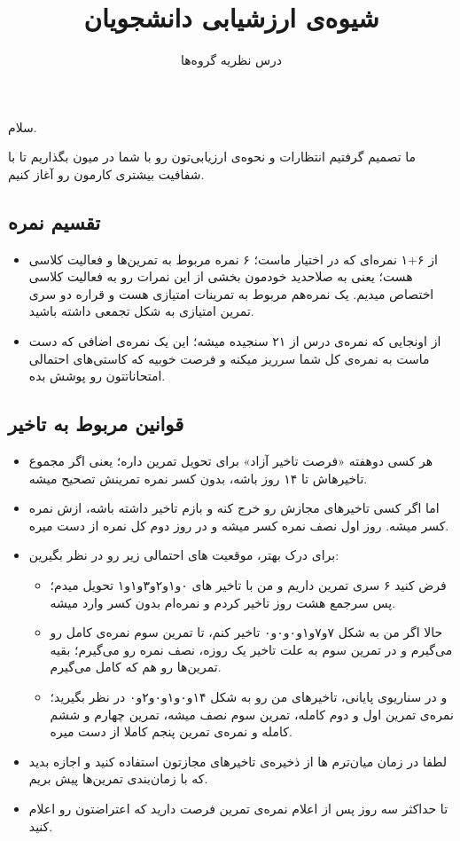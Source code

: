 \documentclass[a4paper, 12pt]{article}
\title{\textbf{
 شیوه‌ی ارزشیابی دانشجویان
}}
\author{درس نظریه گروه‌ها}
\date{}
\begin{document}
\maketitle
سلام.

\noindent

ما تصمیم گرفتیم انتظارات و نحوه‌ی ارزیابی‌تون رو با شما در میون بگذاریم تا با شفافیت بیشتری کارمون رو آغاز کنیم.
\subsection*{تقسیم نمره}
\begin{itemize}
	\item 
	از ۶+۱ نمره‌ای که  در اختیار ماست؛ ۶ نمره مربوط به تمرین‌ها و فعالیت کلاسی هست؛ یعنی به صلاحدید خودمون بخشی از این نمرات رو به فعالیت کلاسی اختصاص میدیم. یک نمره‌هم مربوط به تمرینات امتیازی هست و قراره دو سری تمرین امتیازی به شکل تجمعی داشته باشید.
		\item 
	از اونجایی که نمره‌ی درس از ۲۱ سنجیده میشه؛ این یک نمره‌ی اضافی که دست ماست به نمره‌ی کل شما سرریز میکنه و فرصت خوبیه که کاستی‌های احتمالی امتحاناتتون رو پوشش بده.
	
	\end{itemize}

	
\subsection*{قوانین مربوط به تاخیر }
		\begin{itemize}
	\item 
	هر کسی دوهفته «فرصت تاخیر آزاد» برای تحویل تمرین داره؛ یعنی اگر مجموع تاخیرهاش تا ۱۴ روز باشه، بدون کسر نمره تمرینش تصحیح میشه.
	\item
	اما اگر کسی تاخیرهای مجازش رو خرج کنه و بازم تاخیر داشته باشه، ازش نمره کسر میشه. روز اول نصف نمره کسر میشه و در روز دوم کل نمره از دست میره. 
	
	\item 
	برای درک بهتر، موقعیت های احتمالی زیر رو در نظر بگیرین:
	\begin{itemize}
		\item فرض کنید ۶ سری تمرین داریم و من با تاخیر های ۰و۱و۲و۳و۱و۱ تحویل میدم؛ پس سرجمع هشت روز تاخیر کردم و نمره‌ام بدون کسر وارد میشه.
		\item
		 حالا اگر من به شکل ۷و۷و۱و۰و۰و۰ تاخیر کنم، تا تمرین سوم نمره‌ی کامل رو می‌گیرم و در تمرین سوم به علت تاخیر یک روزه، نصف نمره رو می‌گیرم؛ بقیه تمرین‌ها رو هم که کامل می‌گیرم.
		 \item و در سناریوی پایانی، تاخیرهای من رو به شکل ۱۴و۰و۱و۰و۲و۰
		 در نظر بگیرید؛ نمره‌ی تمرین اول و دوم کامله، تمرین سوم نصف میشه، تمرین چهارم و ششم کامله و نمره‌ی تمرین پنجم کاملا از دست میره.
	\end{itemize}
	\item
	لطفا در زمان میان‌ترم ها از ذخیره‌ی تاخیرهای مجازتون استفاده کنید و اجازه بدید که با زمان‌بندی تمرین‌ها پیش بریم.

	\item 
	تا حداکثر سه روز پس از اعلام‌ نمره‌ی تمرین فرصت دارید که اعتراضتون رو اعلام کنید.
\end{itemize}
\end{document}
